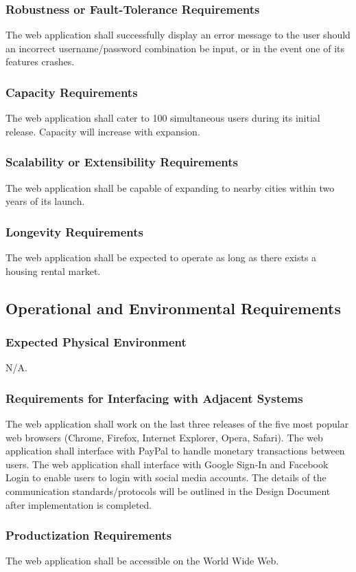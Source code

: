 \documentclass[12pt]{article}
\begin{document}
{\subsubsection{Robustness or Fault-Tolerance Requirements}
The web application shall successfully display an error message to the user 
should an incorrect username/password combination be input, or in the event one of its features crashes.
\subsubsection{Capacity Requirements}
The web application shall cater to 100 simultaneous users during its initial release. Capacity will increase with expansion.
\subsubsection{Scalability or Extensibility Requirements}
The web application shall be capable of expanding to nearby cities within two 
years of its launch.
\subsubsection{Longevity Requirements}
The web application shall be expected to operate as long as there exists a 
housing rental market.
\subsection{Operational and Environmental Requirements}
\subsubsection{Expected Physical Environment}
N/A.
\subsubsection{Requirements for Interfacing with Adjacent Systems}
The web application shall work on the last three releases of the five most 
popular web browsers (Chrome, Firefox, Internet Explorer, Opera, Safari). The 
web application shall interface with PayPal to handle monetary transactions 
between users. The web application shall interface with Google Sign-In and 
Facebook Login to enable users to login with social media accounts. The details 
of the communication standards/protocols will be outlined in the Design Document 
after implementation is completed.
\subsubsection{Productization Requirements}
The web application shall be accessible on the World Wide Web.
}
\end{document}
